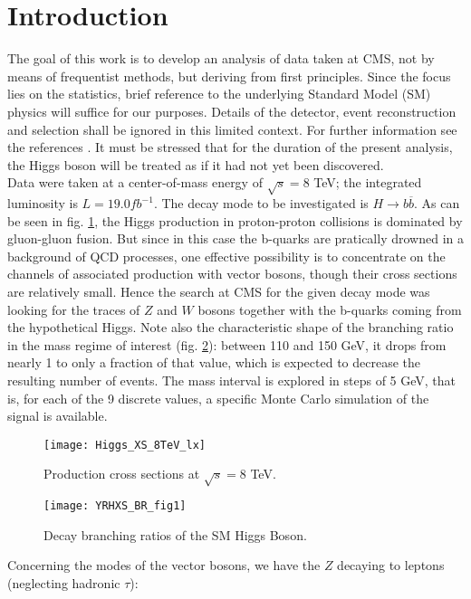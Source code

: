 \documentclass[aps,prb,twocolumn,showpacs,superscriptaddress,groupedaddress]{revtex4}  %
\begin{document}
\section{Introduction}
\label{sec:intro}
The goal of this work is to develop an analysis of data taken at CMS, not by means of frequentist methods, but deriving from first principles. Since the focus lies on the statistics, brief reference to the underlying Standard Model (SM) physics will suffice for our purposes. Details of the detector, event reconstruction and selection shall be ignored in this limited context. For further information see the references \cite{observation,search,jets,annote}. It must be stressed that for the duration of the present ana\-lysis, the Higgs boson will be treated as if it had not yet been discovered.\\
Data were taken at a center-of-mass energy of $\sqrt{s}=8$ TeV; the integrated luminosity is $L= 19.0 fb^{-1}$. The decay mode to be investigated is $H \rightarrow b\overline{b}$. As can be seen in fig. \ref{fig:cross}, the Higgs production in proton-proton collisions is dominated by gluon-gluon fusion. But since in this case the b-quarks are pratically drowned in a background of QCD processes, one effective possibility is to concentrate on the channels of associated production with vector bosons, though their cross sections are relatively small. Hence the search at CMS for the given decay mode was looking for the traces of $Z$ and $W$ bosons together with the b-quarks coming from the hypothetical Higgs. Note also the characteristic shape of the bran\-ching ratio in the mass regime of interest (fig. \ref{fig:branching}): between 110 and 150 GeV, it drops from nearly 1 to only a fraction of that value, which is expected to decrease the resulting number of events. The mass interval is explored in steps of 5 GeV, that is, for each of the 9 discrete values, a specific Monte Carlo simulation of the signal is available.\\
\begin{figure}[ht]
\texttt{[image: Higgs\_XS\_8TeV\_lx]}
\caption{\label{fig:cross} Production cross sections at $\sqrt{s}= 8$ TeV.\cite{annote}}
\end{figure}
\begin{figure}[ht]
\texttt{[image: YRHXS\_BR\_fig1]}
\caption{\label{fig:branching} Decay branching ratios of the SM Higgs Boson.\cite{annote}}
\end{figure}
Concerning the modes of the vector bosons, we have the $Z$ decaying to leptons (neglecting hadronic $\tau$):
\end{document}
